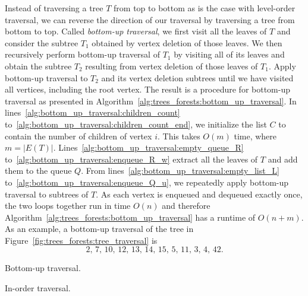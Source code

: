 Instead of traversing a tree $T$ from top to bottom as is the case
with level-order traversal, we can
reverse the direction of our traversal by traversing a tree from
bottom to top. Called
\emph{bottom-up traversal}, we first visit
all the leaves of $T$ and consider the subtree $T_1$
obtained by vertex deletion of those
leaves. We then recursively perform
bottom-up traversal of $T_1$ by visiting
all of its leaves and obtain the subtree $T_2$ resulting from
vertex deletion of those leaves of $T_1$. Apply
bottom-up traversal to $T_2$ and its vertex
deletion subtrees until we have visited all vertices, including the
root vertex. The result is a procedure for bottom-up traversal as
presented in Algorithm~\ref{alg:trees_forests:bottom_up_traversal}. In
lines~\ref{alg:bottom_up_traversal:children_count}
to~\ref{alg:bottom_up_traversal:children_count_end}, we initialize the
list $C$ to contain the number of children of vertex $i$. This takes
$O(m)$ time, where $m =
|E(T)|$. Lines~\ref{alg:bottom_up_traversal:empty_queue_R}
to~\ref{alg:bottom_up_traversal:enqueue_R_w} extract all the leaves
of $T$ and add them to the queue $Q$. From
lines~\ref{alg:bottom_up_traversal:empty_list_L}
to~\ref{alg:bottom_up_traversal:enqueue_Q_u}, we repeatedly apply
bottom-up traversal to subtrees of $T$. As
each vertex is enqueued and
dequeued exactly once, the two loops together run
in time $O(n)$ and therefore
Algorithm~\ref{alg:trees_forests:bottom_up_traversal} has a runtime of
$O(n + m)$. As an example, a bottom-up
traversal of the tree in Figure~\ref{fig:trees_forests:tree_traversal}
is
\[
2,\, 7,\, 10,\, 12,\, 13,\, 14,\, 15,\, 5,\, 11,\, 3,\, 4,\, 42.
\]

\begin{algorithm}[!htbp]

\caption{Bottom-up traversal.}
\label{alg:trees_forests:bottom_up_traversal}
\end{algorithm}

\begin{algorithm}[!htbp]

\caption{In-order traversal.}
\label{alg:trees_forests:in_order_traversal}
\end{algorithm}

